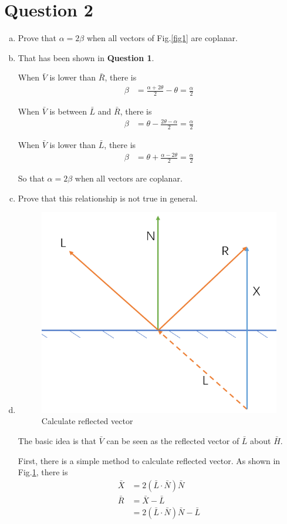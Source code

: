 \documentclass[12pt,a4paper]{article}
\makeatletter
\newtheorem*{solution}{Solution}
\theoremstyle{definition}
\numberwithin{equation}{section}
\numberwithin{figure}{section}
\renewenvironment{solution}[1][Solution] {\par\pushQED{\qed}\normalfont\topsep6\p@\@plus6\p@\relax\trivlist\item[\hskip\labelsep\bfseries#1\@addpunct{.}]\ignorespaces}{\popQED\endtrivlist\@endpefalse} \makeatother
\makeatother
\begin{document}
\section{Question 2}
\begin{enumerate}[a.]
	\item Prove that $\alpha=2\beta$ when all vectors of Fig.\ref{fig1} are coplanar.
	\begin{solution}
		That has been shown in \textbf{Question 1}.
		
		When $\bar{V}$ is lower than $\bar{R}$, there is
		\begin{align*}
			\beta &= \frac{\alpha + 2\theta}{2} - \theta = \frac{\alpha}{2}
		\end{align*}
		
		When $\bar{V}$ is between $\bar{L}$ and $\bar{R}$, there is
		\begin{align*}
			\beta &= \theta - \frac{2\theta-\alpha}{2}=\frac{\alpha}{2}
		\end{align*}
		
		When $\bar{V}$ is lower than $\bar{L}$, there is
		\begin{align*}
			\beta&=\theta + \frac{\alpha-2\theta}{2} = \frac{\alpha}{2}
		\end{align*}
		
		So that $\alpha=2\beta$ when all vectors are coplanar.
	\end{solution}
	\item Prove that this relationship is not true in general.
	\begin{solution}
		\begin{figure}[h]
			\centering
			\includegraphics[width=0.5\linewidth]{reflect.png}
			\caption{Calculate reflected vector}
			\label{fig4}
		\end{figure}
		The basic idea is that $\bar{V}$ can be seen as the reflected vector of $\bar{L}$ about $\bar{H}$.
		
		First, there is a simple method to calculate reflected vector. As shown in Fig.\ref{fig4}, there is
		\begin{align*}
			\bar{X} &= 2(\bar{L}\cdot \bar{N})\bar{N}\\
			\bar{R} &= \bar{X} - \bar{L}\\
			&=2(\bar{L}\cdot \bar{N})\bar{N}- \bar{L}
		\end{align*}
		

\end{solution}
\end{enumerate}
\end{document}

